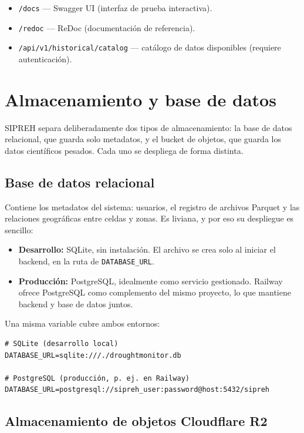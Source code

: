 \begin{itemize}
    \item \texttt{/docs} --- Swagger UI (interfaz de prueba interactiva).
    \item \texttt{/redoc} --- ReDoc (documentación de referencia).
    \item \texttt{/api/v1/historical/catalog} --- catálogo de datos disponibles (requiere autenticación).
\end{itemize}

\section{Almacenamiento y base de datos}
\label{sec:deploy_db}

SIPREH separa deliberadamente dos tipos de almacenamiento: la base de datos relacional, que guarda solo metadatos, y el bucket de objetos, que guarda los datos científicos pesados. Cada uno se despliega de forma distinta.

\subsection{Base de datos relacional}

Contiene los metadatos del sistema: usuarios, el registro de archivos Parquet y las relaciones geográficas entre celdas y zonas. Es liviana, y por eso su despliegue es sencillo:

\begin{itemize}
    \item \textbf{Desarrollo:} SQLite, sin instalación. El archivo se crea solo al iniciar el backend, en la ruta de \texttt{DATABASE\_URL}.
    \item \textbf{Producción:} PostgreSQL, idealmente como servicio gestionado. Railway ofrece PostgreSQL como complemento del mismo proyecto, lo que mantiene backend y base de datos juntos.
\end{itemize}

\begin{example}
Una misma variable cubre ambos entornos:
\begin{verbatim}
# SQLite (desarrollo local)
DATABASE_URL=sqlite:///./droughtmonitor.db

# PostgreSQL (producción, p. ej. en Railway)
DATABASE_URL=postgresql://sipreh_user:password@host:5432/sipreh
\end{verbatim}
\end{example}

\subsection{Almacenamiento de objetos Cloudflare R2}

